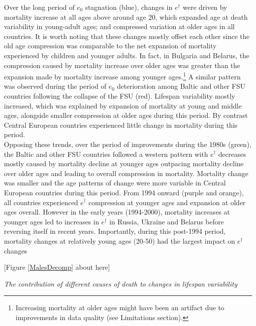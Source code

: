 \documentclass{article}
\begin{document}
\begin{spacing}{1.5}
Over the long period of $e_0$ stagnation (blue), changes in $e^\dagger$ were driven by mortality increase at all ages above around age 20, which expanded age at death variability in young-adult ages; and compressed variation at older ages in all countries. It is worth noting that these changes mostly offset each other since the old age compression was comparable to the net expansion of mortality experienced by children and younger adults. In fact, in Bulgaria and Belarus, the compression caused by mortality increase over older ages was greater than the expansion made by mortality increase among younger ages.\footnote{Increasing mortality at older ages might have been an artifact due to improvements in data quality (see Limitations section).} A similar pattern was observed during the period of $e_0$ deterioration among Baltic and other FSU countries following the collapse of the FSU (red). Lifespan variability mostly increased, which was explained by expansion of mortality at young and middle ages, alongside smaller compression at older ages during this period. By contrast Central European countries experienced little change in mortality during this period.\\

Opposing these trends, over the period of improvements during the 1980s (green), the Baltic and other FSU countries followed a western pattern with $e^\dagger$ decreases mostly caused by mortality decline at younger ages outpacing mortality decline over older ages and leading to overall compression in mortality. Mortality change was smaller and the age patterns of change were more variable in Central European countries during this period. From 1994 onward (purple and orange), all countries experienced $e^\dagger$ compression at younger ages and expansion at older ages overall. However in the early years (1994-2000), mortality increases at younger ages led to increases in $e^\dagger$ in Russia, Ukraine and Belarus before reversing itself in recent years. Importantly, during this post-1994 period, mortality changes at relatively young ages (20-50) had the largest impact on $e^\dagger$ changes\\



\begin{center}
[Figure \ref{MalesDecomp} about here]\\
\end{center}

\emph{The contribution of different causes of death to changes in lifespan variability}\\


\end{spacing}
\end{document}
